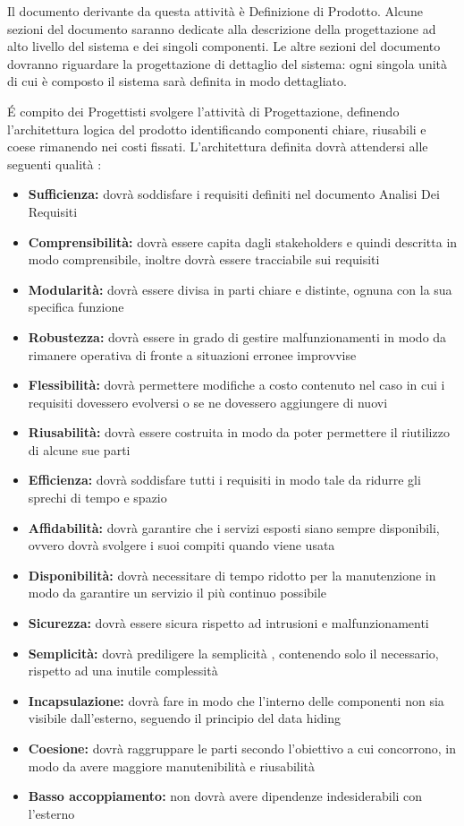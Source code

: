 Il documento derivante da questa attività è Definizione di Prodotto. Alcune sezioni del documento saranno dedicate alla descrizione della progettazione ad alto livello del
sistema e dei singoli componenti. Le altre sezioni del documento dovranno riguardare la progettazione di dettaglio del sistema: ogni singola unità di cui è composto il sistema sarà definita in modo dettagliato. 

\'E compito dei Progettisti svolgere l'attività di Progettazione, definendo l'architettura logica del prodotto identificando componenti chiare, riusabili e coese rimanendo nei costi fissati. L'architettura definita dovrà  attendersi alle seguenti qualità : 

\begin{itemize}
\item \textbf{Sufficienza:} dovrà  soddisfare i requisiti definiti nel documento Analisi Dei Requisiti
\item \textbf{Comprensibilità:} dovrà essere capita dagli stakeholders e quindi descritta in modo comprensibile, inoltre dovrà essere tracciabile sui requisiti
\item \textbf{Modularità:} dovrà essere divisa in parti chiare e distinte, ognuna con la sua specifica funzione
\item \textbf{Robustezza:} dovrà  essere in grado di gestire malfunzionamenti in modo da rimanere operativa di fronte a situazioni erronee improvvise
\item \textbf{Flessibilità:} dovrà  permettere modifiche a costo contenuto nel caso in cui i requisiti dovessero evolversi o se ne dovessero aggiungere di nuovi
\item \textbf{Riusabilità:} dovrà  essere costruita in modo da poter permettere il riutilizzo di alcune sue parti
\item \textbf{Efficienza:}  dovrà  soddisfare tutti i requisiti in modo tale da ridurre gli sprechi di tempo e spazio
\item \textbf{Affidabilità:}  dovrà  garantire che i servizi esposti siano sempre disponibili, ovvero dovrà svolgere i suoi compiti quando viene usata
\item \textbf{Disponibilità:} dovrà  necessitare di tempo ridotto per la manutenzione in modo da garantire un servizio il più continuo possibile
\item \textbf{Sicurezza:} dovrà  essere sicura rispetto ad intrusioni e malfunzionamenti
\item \textbf{Semplicità:} dovrà prediligere la semplicità , contenendo solo il necessario, rispetto
ad una inutile complessità 
\item \textbf{Incapsulazione:} dovrà  fare in modo che l'interno delle componenti non sia visibile
dall'esterno, seguendo il principio del data hiding
\item \textbf{Coesione:} dovrà  raggruppare le parti secondo l'obiettivo a cui concorrono, in modo
da avere maggiore manutenibilità  e riusabilità
\item \textbf{Basso accoppiamento:} non dovrà avere dipendenze indesiderabili con l'esterno
  \end{itemize}



